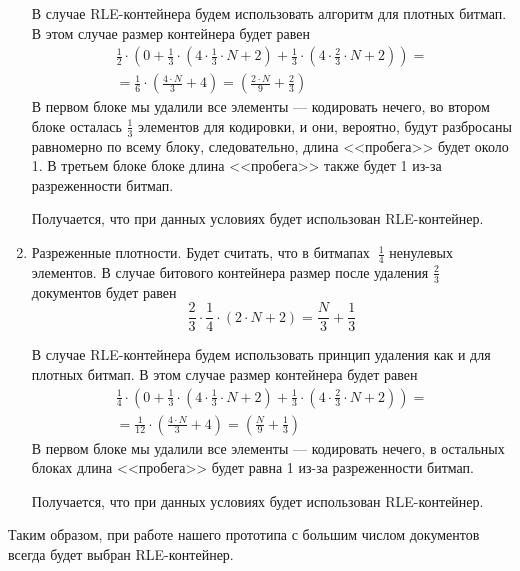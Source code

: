 \begin{enumerate}
    В случае RLE-контейнера будем использовать алгоритм для плотных битмап.
    В этом случае размер контейнера будет равен
    \begin{multline}
        \frac{1}{2} \cdot \left(0 +
            \frac{1}{3} \cdot \left(4 \cdot \frac{1}{3} \cdot N + 2\right) +
            \frac{1}{3} \cdot \left(4 \cdot \frac{2}{3} \cdot N + 2\right)
            \right) =\\
            = \frac{1}{6} \cdot \left(\frac{4 \cdot N}{3} + 4\right)
            = \left(\frac{2 \cdot N}{9} + \frac{2}{3}\right)
    \end{multline}
    В первом блоке мы удалили все элементы — кодировать нечего, во втором блоке
    осталась $\frac{1}{3}$ элементов для кодировки, и они, вероятно, будут
    разбросаны равномерно по всему блоку, следовательно, длина <<пробега>> будет около 1.
    В третьем блоке блоке длина <<пробега>> также будет 1 из-за разреженности битмап.

    Получается, что при данных условиях будет использован RLE-контейнер.

    \item Разреженные плотности. Будет считать, что в битмапах $~ \frac{1}{4}$
    ненулевых элементов. В случае битового контейнера размер после удаления
    $\frac{2}{3}$ документов будет равен
    \begin{equation}
        \frac{2}{3} \cdot \frac{1}{4} \cdot \left(2\cdot N + 2\right) = \frac{N}{3} + \frac{1}{3}
    \end{equation}

    В случае RLE-контейнера будем использовать принцип удаления как и для
    плотных битмап. В этом случае размер контейнера будет равен
    \begin{multline}
        \frac{1}{4} \cdot \left(0 +
            \frac{1}{3} \cdot \left(4 \cdot \frac{1}{3} \cdot N + 2\right) +
            \frac{1}{3} \cdot \left(4 \cdot \frac{2}{3} \cdot N + 2\right)
            \right) =\\
            = \frac{1}{12} \cdot \left(\frac{4 \cdot N}{3} + 4\right)
            = \left(\frac{N}{9} + \frac{1}{3}\right)
    \end{multline}
    В первом блоке мы удалили все элементы — кодировать нечего, в остальных блоках
    длина <<пробега>> будет равна 1 из-за разреженности битмап.

    Получается, что при данных условиях будет использован RLE-контейнер.
\end{enumerate}

Таким образом, при работе нашего прототипа с большим числом документов всегда
будет выбран RLE-контейнер.

